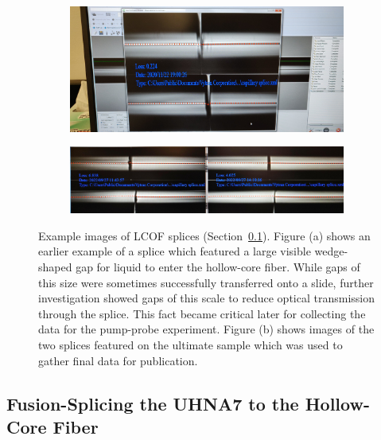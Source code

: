 \begin{figure}[t]
    \centering
    \begin{subfigure}[b]{\textwidth}
        \centering
        \includegraphics[width=\textwidth]{figs/3-Cooling/bigGapSplice.jpg}
        \caption{}
        \label{fig:Cooling:big gap splice}
    \end{subfigure}
    \vspace{0.5cm}
    \begin{subfigure}[b]{\textwidth}
        \centering
        \includegraphics[width=\textwidth]{figs/3-Cooling/finalSampleVytranSplice.jpeg}
        \caption{}
        \label{fig:Cooling:final splice used for data}
    \end{subfigure}
    \caption{Example images of \ac{LCOF} splices (Section~\ref{subsec:Cooling:Fusion-Splicing to Hollow-Core}). Figure (a) shows an earlier example of a splice which featured a large visible wedge-shaped gap for liquid to enter the hollow-core fiber. While gaps of this size were sometimes successfully transferred onto a slide, further investigation showed gaps of this scale to reduce optical transmission through the splice. This fact became critical later for collecting the data for the pump-probe experiment. Figure (b) shows images of the two splices featured on the ultimate sample which was used to gather final data for publication.}
    \label{fig:Cooling:example splice images}
\end{figure}

\FloatBarrier

\subsection{Fusion-Splicing the \acs{UHNA7} to the Hollow-Core Fiber}
\label{subsec:Cooling:Fusion-Splicing to Hollow-Core}

